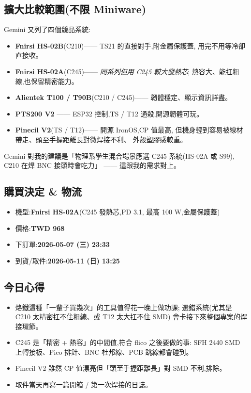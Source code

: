 \subsection*{擴大比較範圍(不限 Miniware)}

Gemini 又列了四個競品系統:

\begin{itemize}[leftmargin=2em,itemsep=0pt]
  \item \textbf{Fnirsi HS-02B}(C210)—— TS21 的直接對手,附金屬保護蓋,
        用完不用等冷卻直接收。
  \item \textbf{Fnirsi HS-02A}(C245)—— \emph{同系列但用 C245 較大發熱芯};
        熱容大、能扛粗線,也保留精密能力。
  \item \textbf{Alientek T100 / T90B}(C210 / C245)—— 韌體穩定、顯示資訊詳盡。
  \item \textbf{PTS200 V2} —— ESP32 控制,TS / T12 通殺,開源韌體可玩。
  \item \textbf{Pinecil V2}(TS / T12)—— 開源 IronOS,CP 值最高,
        但機身輕到容易被線材帶走、頭至手握距離長對微焊接不利、
        外殼塑膠感較重。
\end{itemize}

Gemini 對我的建議是「物理系學生混合場景應選 C245 系統(HS-02A 或 S99),
C210 在焊 BNC 接頭時會吃力」 —— 這跟我的需求對上。

\subsection*{購買決定 \& 物流}

\begin{itemize}[leftmargin=2em,itemsep=0pt]
  \item 機型:\textbf{Fnirsi HS-02A}(C245 發熱芯,PD 3.1, 最高 100 W,金屬保護蓋)
  \item 價格:\textbf{TWD 968}
  \item 下訂單:\textbf{2026-05-07 (三) 23:33}
  \item 到貨/取件:\textbf{2026-05-11 (日) 13:25}
\end{itemize}

\subsection*{今日心得}

\begin{itemize}[leftmargin=2em,itemsep=0pt]
  \item 烙鐵這種「一輩子買幾次」的工具值得花一晚上做功課;
        選錯系統(尤其是 C210 太精密扛不住粗線、或 T12 太大扛不住 SMD)
        會卡接下來整個專案的焊接環節。
  \item C245 是「精密 + 熱容」的中間值,符合 flico 之後要做的事:
        SFH 2440 SMD 上轉接板、Pico 排針、BNC 杜邦線、PCB 跳線都會碰到。
  \item Pinecil V2 雖然 CP 值漂亮但「頭至手握距離長」對 SMD 不利,排除。
  \item 取件當天再寫一篇開箱 / 第一次焊接的日誌。
\end{itemize}
